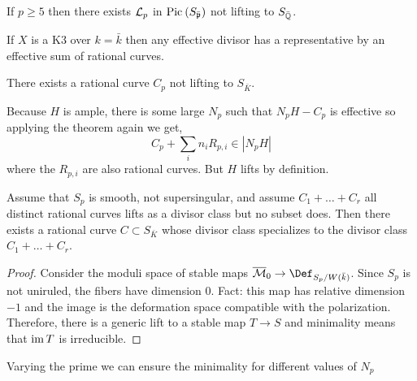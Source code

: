 \documentclass[12pt]{article}
\begin{document}
\begin{prop}
If $p \ge 5$ then there exists $\mathcal{L}_p$ in $\mathrm{Pic}^{} \left( S_{\bar{\mathfrak{p}}} \right)$ not lifting to $S_{\bar{\mathbb{Q}}}$. 
\end{prop}

\begin{theorem}
If $X$ is a K3 over $k = \bar{k}$ then any effective divisor has a representative by an effective sum of rational curves.
\end{theorem}

\begin{cor}
There exists a rational curve $C_p$ not lifting to $S_{\bar{K}}$. 
\end{cor}

Because $H$ is ample, there is some large $N_p$ such that $N_p H - C_p$ is effective so applying the theorem again we get,
\[ C_p + \sum_i n_i R_{p,i} \in | N_p H | \]
where the $R_{p,i}$ are also rational curves. But $H$ lifts by definition.  

\begin{prop}
Assume that $S_p$ is smooth, not supersingular, and assume $C_1 + \dots + C_r$ all distinct rational curves lifts as a divisor class but no subset does. Then there exists a rational curve $C \subset S_{\bar{K}}$ whose divisor class specializes to the divisor class $C_1 + \dots + C_r$. 
\end{prop}

\begin{proof}
Consider the moduli space of stable maps $\ol{\M}_0 \to \Def_{S_p / W(\bar{k})}$. Since $S_p$ is not uniruled, the fibers have dimension $0$. Fact: this map has relative dimension $-1$ and the image is the deformation space compatible with the polarization. Therefore, there is a generic lift to a stable map $T \to S$ and minimality means that $\operatorname{\mathrm{im}}{T}$ is irreducible. 
\end{proof}

Varying the prime we can ensure the minimality for different values of $N_p$ 
\end{document}
